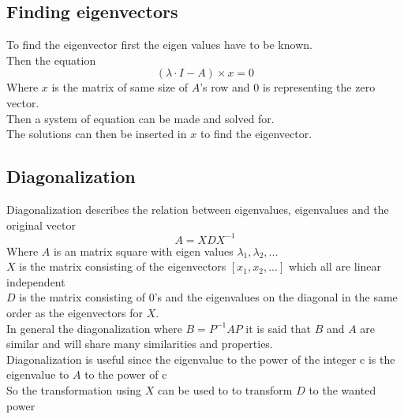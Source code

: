 \documentclass[12pt, a4paper]{article}
\begin{document}
		\subsection{Finding eigenvectors}
			To find the eigenvector first the eigen values have to be known.\\
			Then the equation
			$$(\lambda\cdot I-A)\times x=0$$
			Where $x$ is the matrix of same size of $A$'s row and 0 is representing the zero vector.\\
			Then a system of equation can be made and solved for. \\
			The solutions can then be inserted in $x$ to find the eigenvector.
		\subsection{Diagonalization}
			Diagonalization describes the relation between eigenvalues, eigenvalues and the original vector
			$$A=XDX^{-1}$$
			Where $A$ is an matrix square with eigen values $\lambda_1,\lambda_2,...$\\
			$X$ is the matrix consisting of the eigenvectors $[x_1,x_2,...]$ which all are linear independent\\
			$D$ is the matrix consisting of 0's and the eigenvalues on the diagonal in the same order as the eigenvectors for $X$.\\[4mm]
			In general the diagonalization where $B=P^{-1}AP$ it is said that $B$ and $A$ are similar and will share many similarities and properties.\\
			Diagonalization is useful since the eigenvalue to the power of the integer c is the eigenvalue to $A$ to the power of c\\
			So the transformation using $X$ can be used to to transform $D$ to the wanted power
\end{document}
